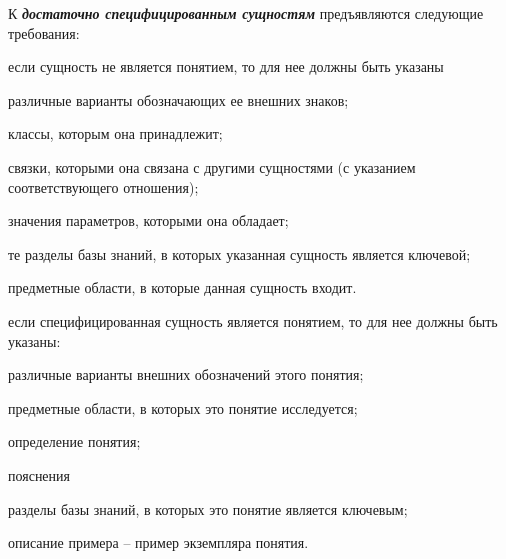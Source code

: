 К \textbf{\textit{достаточно специфицированным сущностям}} предъявляются следующие требования:
\begin{textitemize}
\item если сущность не является понятием, то для нее должны быть указаны
\begin{textitemize}
	\item различные варианты обозначающих ее внешних знаков;
	\item классы, которым она принадлежит;
	\item связки, которыми она связана с другими сущностями (с указанием соответствующего отношения);
	\item значения параметров, которыми она обладает;
	\item те разделы базы знаний, в которых указанная сущность является ключевой;
	\item предметные области, в которые данная сущность входит.
\end{textitemize}
\item если специфицированная сущность является понятием, то для нее должны быть указаны:
\begin{textitemize}
	\item различные варианты внешних обозначений этого понятия;
	\item предметные области, в которых это понятие исследуется;
	\item определение понятия;
	\item пояснения
	\item разделы базы знаний, в которых это понятие является ключевым;
	\item описание примера -- пример экземпляра понятия.
\end{textitemize}
\end{textitemize}



\begin{SCn}

\begin{scnsubdividing}
\end{scnsubdividing}
\end{SCn}

